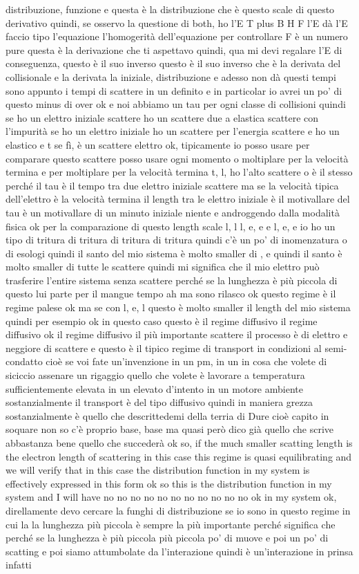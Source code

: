 distribuzione, funzione e questa è la distribuzione che è questo scale di questo derivativo quindi, se osservo la questione di both, ho l'E T plus B H F l'E dà l'E faccio tipo l'equazione l'homogerità dell'equazione per controllare F è un numero pure questa è la derivazione che ti aspettavo quindi, qua mi devi regalare l'E di conseguenza, questo è il suo inverso questo è il suo inverso che è la derivata del collisionale e la derivata la iniziale, distribuzione e adesso non dà questi tempi sono appunto i tempi di scattere in un definito e in particolar io avrei un po' di questo minus di over ok e noi abbiamo un tau per ogni classe di collisioni quindi se ho un elettro iniziale scattere ho un scattere due a elastica scattere con l'impurità se ho un elettro iniziale ho un scattere per l'energia scattere e ho un elastico e t se fì, è un scattere elettro ok, tipicamente io posso usare per comparare questo scattere posso usare ogni momento o moltiplare per la velocità termina e per moltiplare per la velocità termina t, l, ho l'alto scattere o è il stesso perché il tau è il tempo tra due elettro iniziale scattere ma se la velocità tipica dell'elettro è la velocità termina il length tra le elettro iniziale è il motivallare del tau è un motivallare di un minuto iniziale niente e androggendo dalla modalità fisica ok per la comparazione di questo length scale l, l l, e, e e l, e, e io ho un tipo di tritura di tritura di tritura di tritura quindi c'è un po' di inomenzatura o di esologi quindi il santo del mio sistema è molto smaller di , e quindi il santo è molto smaller di tutte le scattere quindi mi significa che il mio elettro può trasferire l'entire sistema senza scattere perché se la lunghezza è più piccola di questo lui parte per il mangue tempo ah ma sono rilasco ok questo regime è il regime palese ok ma se con l, e, l questo è molto smaller il length del mio sistema quindi per esempio ok in questo caso questo è il regime diffusivo il regime diffusivo ok il regime diffusivo il più importante scattere il processo è di elettro e neggiore di scattere e questo è il tipico regime di transport in condizioni al semi-condatto cioè se voi fate un'invenzione in un pm, in un in cosa che volete di siciccio assenare un rigaggio quello che volete è lavorare a temperatura sufficientemente elevata in un elevato d'intento in un motore ambiente sostanzialmente il transport è del tipo diffusivo quindi in maniera grezza sostanzialmente è quello che descrittedemi della terria di Dure cioè capito in soquare non so c'è proprio base, base ma quasi però dico già quello che scrive abbastanza bene quello che succederà ok so, if the much smaller scatting length is the electron length of scattering in this case this regime is quasi equilibrating and we will verify that in this case the distribution function in my system is effectively expressed in this form ok so this is the distribution function in my system and I will have no no no no no no no no no no no ok in my system ok, direllamente devo cercare la funghi di distribuzione se io sono in questo regime in cui la la lunghezza più piccola è sempre la più importante perché significa che perché se la lunghezza è più piccola più piccola po' di muove e poi un po' di scatting e poi siamo attumbolate da l'interazione quindi è un'interazione in prinsa infatti 